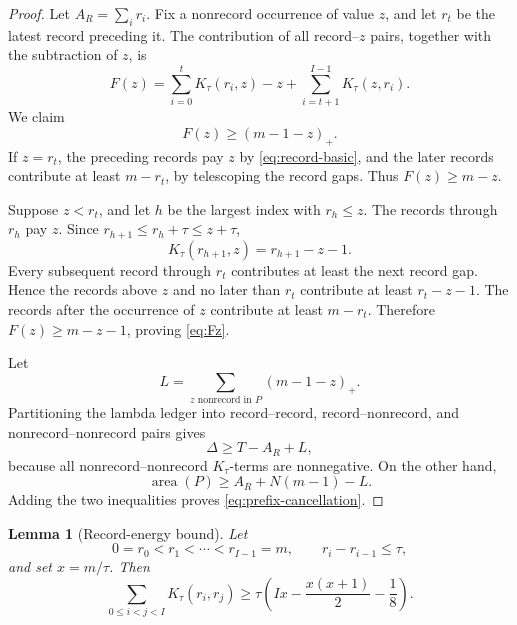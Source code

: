 \documentclass[11pt]{article}
\newtheorem{lemma}[theorem]{Lemma}
\theoremstyle{definition}
\theoremstyle{remark}
\newcommand{\area}{\operatorname{area}}
\begin{document}
\begin{proof}
Let \(A_R=\sum_i r_i\).  Fix a nonrecord occurrence of value \(z\), and
let \(r_t\) be the latest record preceding it.  The contribution of all
record--\(z\) pairs, together with the subtraction of \(z\), is
\[
  F(z)=
  \sum_{i=0}^{t}K_\tau(r_i,z)-z
  +\sum_{i=t+1}^{I-1}K_\tau(z,r_i).
\]
We claim
\begin{equation}
  F(z)\ge(m-1-z)_+.
  \label{eq:Fz}
\end{equation}
If \(z=r_t\), the preceding records pay \(z\) by
\eqref{eq:record-basic}, and the later records contribute at least
\(m-r_t\), by telescoping the record gaps.  Thus
\(F(z)\ge m-z\).

Suppose \(z<r_t\), and let \(h\) be the largest index with
\(r_h\le z\).  The records through \(r_h\) pay \(z\).  Since
\(r_{h+1}\le r_h+\tau\le z+\tau\),
\[
  K_\tau(r_{h+1},z)=r_{h+1}-z-1.
\]
Every subsequent record through \(r_t\) contributes at least the next
record gap.  Hence the records above \(z\) and no later than \(r_t\)
contribute at least \(r_t-z-1\).  The records after the occurrence of
\(z\) contribute at least \(m-r_t\).  Therefore
\(F(z)\ge m-z-1\), proving \eqref{eq:Fz}.

Let
\[
  L=\sum_{z\text{ nonrecord in }P}(m-1-z)_+.
\]
Partitioning the lambda ledger into record--record, record--nonrecord, and
nonrecord--nonrecord pairs gives
\[
  \Delta\ge T-A_R+L,
\]
because all nonrecord--nonrecord \(K_\tau\)-terms are nonnegative.
On the other hand,
\[
  \area(P)\ge A_R+N(m-1)-L.
\]
Adding the two inequalities proves \eqref{eq:prefix-cancellation}.
\end{proof}

\begin{lemma}[Record-energy bound]
\label{lem:record-energy}
Let
\[
  0=r_0<r_1<\cdots<r_{I-1}=m,
  \qquad r_i-r_{i-1}\le\tau,
\]
and set \(x=m/\tau\).  Then
\begin{equation}
  \sum_{0\le i<j<I}K_\tau(r_i,r_j)
  \ge
  \tau\left(Ix-\frac{x(x+1)}2-\frac18\right).
  \label{eq:record-energy}
\end{equation}
\end{lemma}
\end{document}
